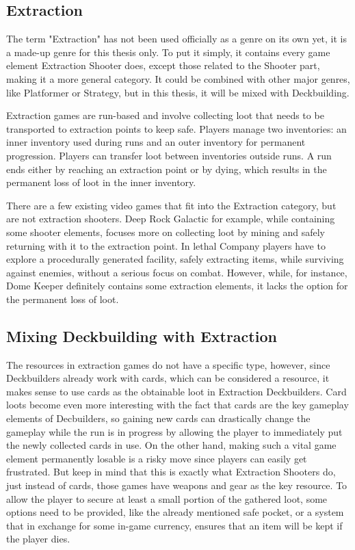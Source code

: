 \subsection{Extraction}

The term "Extraction" has not been used officially as a genre on its own yet, it is a made-up genre for this thesis only. To put it simply, it contains every game element Extraction Shooter does, except those related to the Shooter part, making it a more general category. It could be combined with other major genres, like Platformer or Strategy, but in this thesis, it will be mixed with Deckbuilding. 

Extraction games are run-based and involve collecting loot that needs to be transported to extraction points to keep safe. Players manage two inventories: an inner inventory used during runs and an outer inventory for permanent progression. Players can transfer loot between inventories outside runs. A run ends either by reaching an extraction point or by dying, which results in the permanent loss of loot in the inner inventory.

There are a few existing video games that fit into the Extraction category, but are not extraction shooters. Deep Rock Galactic\cite{deepRockGalactic2018} for example, while containing some shooter elements, focuses more on collecting loot by mining and safely returning with it to the extraction point. In lethal Company\cite{lethalCompany2023} players have to explore a procedurally generated facility, safely extracting items, while surviving against enemies, without a serious focus on combat. However, while, for instance, Dome Keeper\cite{domeKeeper2022} definitely contains some extraction elements, it lacks the option for the permanent loss of loot.



\subsection{Mixing Deckbuilding with Extraction}

The resources in extraction games do not have a specific type, however, since Deckbuilders already work with cards, which can be considered a resource, it makes sense to use cards as the obtainable loot in Extraction Deckbuilders. Card loots become even more interesting with the fact that cards are the key gameplay elements of Decbuilders, so gaining new cards can drastically change the gameplay while the run is in progress by allowing the player to immediately put the newly collected cards in use. On the other hand, making such a vital game element permanently losable is a risky move since players can easily get frustrated. But keep in mind that this is exactly what Extraction Shooters do, just instead of cards, those games have weapons and gear as the key resource. To allow the player to secure at least a small portion of the gathered loot, some options need to be provided, like the already mentioned safe pocket, or a system that in exchange for some in-game currency, ensures that an item will be kept if the player dies.

